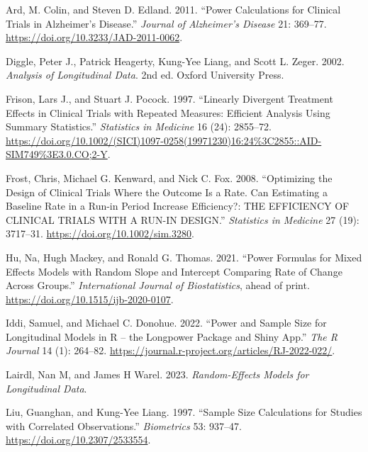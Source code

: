 \documentclass[
  11pt,
]{article}
\newlength{\cslhangindent}
\newenvironment{CSLReferences}[2] %
 {\begin{list}{}{%
  \setlength{\itemindent}{0pt}
  \setlength{\leftmargin}{0pt}
  \setlength{\parsep}{0pt}
  \ifodd #1
   \setlength{\leftmargin}{\cslhangindent}
   \setlength{\itemindent}{-1\cslhangindent}
  \fi
  \setlength{\itemsep}{#2\baselineskip}}}
 {\end{list}}
\begin{document}
\protect{}\label{refs}
\begin{CSLReferences}{1}{1}
Ard, M. Colin, and Steven D. Edland. 2011. {``Power Calculations for
Clinical Trials in {Alzheimer's} Disease.''} \emph{Journal of
Alzheimer's Disease} 21: 369--77.
\url{https://doi.org/10.3233/JAD-2011-0062}.

Diggle, Peter J., Patrick Heagerty, Kung-Yee Liang, and Scott L. Zeger.
2002. \emph{Analysis of Longitudinal Data}. 2nd ed. Oxford University
Press.

Frison, Lars J., and Stuart J. Pocock. 1997. {``Linearly Divergent
Treatment Effects in Clinical Trials with Repeated Measures: Efficient
Analysis Using Summary Statistics.''} \emph{Statistics in Medicine} 16
(24): 2855--72.
\url{https://doi.org/10.1002/(SICI)1097-0258(19971230)16:24\%3C2855::AID-SIM749\%3E3.0.CO;2-Y}.

Frost, Chris, Michael G. Kenward, and Nick C. Fox. 2008. {``Optimizing
the Design of Clinical Trials Where the Outcome Is a Rate. {Can}
Estimating a Baseline Rate in a Run-in Period Increase Efficiency?:
{THE} {EFFICIENCY} {OF} {CLINICAL} {TRIALS} {WITH} {A} {RUN}-{IN}
{DESIGN}.''} \emph{Statistics in Medicine} 27 (19): 3717--31.
\url{https://doi.org/10.1002/sim.3280}.

Hu, Na, Hugh Mackey, and Ronald G. Thomas. 2021. {``Power Formulas for
Mixed Effects Models with Random Slope and Intercept Comparing Rate of
Change Across Groups.''} \emph{International Journal of Biostatistics},
ahead of print. \url{https://doi.org/10.1515/ijb-2020-0107}.

Iddi, Samuel, and Michael C. Donohue. 2022. {``Power and Sample Size for
Longitudinal Models in {R} -- the Longpower Package and {Shiny} App.''}
\emph{The R Journal} 14 (1): 264--82.
\url{https://journal.r-project.org/articles/RJ-2022-022/}.

Lairdl, Nan M, and James H Warel. 2023. \emph{Random-{Effects} {Models}
for {Longitudinal} {Data}}.

Liu, Guanghan, and Kung-Yee Liang. 1997. {``Sample Size Calculations for
Studies with Correlated Observations.''} \emph{Biometrics} 53: 937--47.
\url{https://doi.org/10.2307/2533554}.


\end{CSLReferences}
\end{document}
